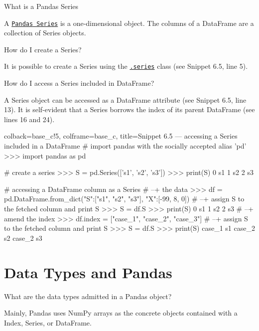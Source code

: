 \documentclass[a4paper,11pt]{book}
\numberwithin{figure}{chapter}
\numberwithin{table}{chapter}
\newcommand{\question}[1]{%
    \begin{tcolorbox}[colback=comp_c!10,colframe=comp_c,sidebyside align=top,width=\linewidth,before skip=1ex]
        #1
    \end{tcolorbox}
    \switchcolumn%
}
\newcommand{\note}[1]{%
    \begin{tcolorbox}[colback=white!0,colframe=white!10,width=\linewidth,before skip=1ex]
        #1
    \end{tcolorbox}
}
\begin{document}
\begin{paracol}{2}
	\question{\raggedright What is a Pandas Series}
	\note{A \href{https://pandas.pydata.org/docs/reference/series.html}{\texttt{Pandas Series}} is a one-dimensional object. The columns of a DataFrame are a collection of Series objects.}
\end{paracol}

\begin{paracol}{2}
	\question{\raggedright How do I create a Series?}
	\note{It is possible to create a Series using the \href{https://pandas.pydata.org/docs/reference/series.html}{\texttt{.series}} class (see Snippet 6.5, line 5).}
\end{paracol}

\begin{paracol}{2}
	\question{\raggedright How do I access a Series included in DataFrame?}
	\note{A Series object can be accessed as a DataFrame attribute (see Snippet 6.5, line 13). It is self-evident that a Series borrows the index of its parent DataFrame (see lines 16 and 24).}
\end{paracol}

\begin{pythoncode}[linenos=True]{colback=base_c!5, colframe=base_c, title=\sffamily Snippet 6.5 --- accessing a Series included in a DataFrame}
# import pandas with the socially accepted alias 'pd'
>>> import pandas as pd

# create a series 
>>> S = pd.Series(['s1', 's2', 's3'])
>>> print(S)
0    s1
1    s2
2    s3

# accessing a DataFrame column as a Series
# --+ the data 
>>> df = pd.DataFrame.from_dict({"S":["s1", "s2", "s3"], "X":[-99, 8, 0]})
# --+ assign S to the fetched column and print S
>>> S = df.S
>>> print(S)
0    s1
1    s2
2    s3
# --+ amend the index
>>> df.index = ["case_1", "case_2", "case_3"]
# --+ assign S to the fetched column and print S
>>> S = df.S
>>> print(S)
case_1    s1
case_2    s2
case_2    s3
\end{pythoncode}

\section{Data Types and Pandas} 

\begin{paracol}{2}
	\question{\raggedright What are the data types admitted in a Pandas object?}
	\note{Mainly, Pandas uses NumPy arrays as the concrete objects contained with a Index, Series, or DataFrame.}
\end{paracol}
\end{document}
